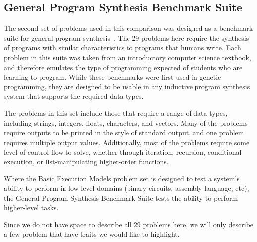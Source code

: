 \subsection{General Program Synthesis Benchmark Suite}
The second set of problems used in this comparison was designed as a benchmark suite for general program synthesis~\cite{Helmuth2015b}. The 29 problems here require the synthesis of programs with similar characteristics to programs that humans write. Each problem in this suite was taken from an introductory computer science textbook, and therefore emulates the type of programming expected of students who are learning to program. While these benchmarks were first used in genetic programming, they are designed to be usable in any inductive program synthesis system that supports the required data types.

The problems in this set include those that require a range of data types, including strings, integers, floats, characters, and vectors. Many of the problems require outputs to be printed in the style of standard output, and one problem requires multiple output values. Additionally, most of the problems require some level of control flow to solve, whether through iteration, recursion, conditional execution, or list-manipulating higher-order functions.

Where the Basic Execution Models problem set is designed to test a system's ability to perform in low-level domains (binary circuits, assembly language, etc), the General Program Synthesis Benchmark Suite tests the ability to perform higher-level tasks.

Since we do not have space to describe all 29 problems here, we will only describe a few problem that have traits we would like to highlight.

